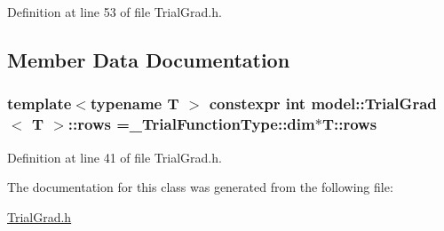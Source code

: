 Definition at line 53 of file Trial\+Grad.\+h.



\subsection{Member Data Documentation}
\hypertarget{classmodel_1_1_trial_grad_ac56f69d52fed2745e62c5fb1c5be86dd}{}
\subsubsection[{rows}]{\setlength{\rightskip}{0pt plus 5cm}template$<$typename T $>$ constexpr int {\bf model\+::\+Trial\+Grad}$<$ {\bf T} $>$\+::rows ={\bf \+\_\+\+Trial\+Function\+Type\+::dim}$\ast$T\+::rows\hspace{0.3cm}{\ttfamily [static]}}\label{classmodel_1_1_trial_grad_ac56f69d52fed2745e62c5fb1c5be86dd}


Definition at line 41 of file Trial\+Grad.\+h.



The documentation for this class was generated from the following file\+:\begin{DoxyCompactItemize}
\item 
\hyperlink{_trial_grad_8h}{Trial\+Grad.\+h}\end{DoxyCompactItemize}
